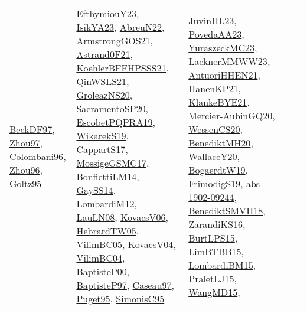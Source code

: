 {\begin{longtable}{llp{6cm}p{6cm}p{6cm}}
\href{papers/BeckDF97.pdf}{BeckDF97}\cite{BeckDF97}, \href{articles/Zhou97.pdf}{Zhou97}\cite{Zhou97}, \href{papers/Colombani96.pdf}{Colombani96}\cite{Colombani96}, \href{papers/Zhou96.pdf}{Zhou96}\cite{Zhou96}, \href{papers/Goltz95.pdf}{Goltz95}\cite{Goltz95} & \href{papers/EfthymiouY23.pdf}{EfthymiouY23}\cite{EfthymiouY23}, \href{articles/IsikYA23.pdf}{IsikYA23}\cite{IsikYA23}, \href{articles/AbreuN22.pdf}{AbreuN22}\cite{AbreuN22}, \href{papers/ArmstrongGOS21.pdf}{ArmstrongGOS21}\cite{ArmstrongGOS21}, \href{papers/Astrand0F21.pdf}{Astrand0F21}\cite{Astrand0F21}, \href{articles/KoehlerBFFHPSSS21.pdf}{KoehlerBFFHPSSS21}\cite{KoehlerBFFHPSSS21}, \href{articles/QinWSLS21.pdf}{QinWSLS21}\cite{QinWSLS21}, \href{papers/GroleazNS20.pdf}{GroleazNS20}\cite{GroleazNS20}, \href{articles/SacramentoSP20.pdf}{SacramentoSP20}\cite{SacramentoSP20}, \href{articles/EscobetPQPRA19.pdf}{EscobetPQPRA19}\cite{EscobetPQPRA19}, \href{articles/WikarekS19.pdf}{WikarekS19}\cite{WikarekS19}, \href{papers/CappartS17.pdf}{CappartS17}\cite{CappartS17}, \href{papers/MossigeGSMC17.pdf}{MossigeGSMC17}\cite{MossigeGSMC17}, \href{papers/BonfiettiLM14.pdf}{BonfiettiLM14}\cite{BonfiettiLM14}, \href{papers/GaySS14.pdf}{GaySS14}\cite{GaySS14}, \href{articles/LombardiM12.pdf}{LombardiM12}\cite{LombardiM12}, \href{papers/LauLN08.pdf}{LauLN08}\cite{LauLN08}, \href{papers/KovacsV06.pdf}{KovacsV06}\cite{KovacsV06}, \href{papers/HebrardTW05.pdf}{HebrardTW05}\cite{HebrardTW05}, \href{articles/VilimBC05.pdf}{VilimBC05}\cite{VilimBC05}, \href{papers/KovacsV04.pdf}{KovacsV04}\cite{KovacsV04}, \href{papers/VilimBC04.pdf}{VilimBC04}\cite{VilimBC04}, \href{articles/BaptisteP00.pdf}{BaptisteP00}\cite{BaptisteP00}, \href{papers/BaptisteP97.pdf}{BaptisteP97}\cite{BaptisteP97}, \href{papers/Caseau97.pdf}{Caseau97}\cite{Caseau97}, \href{papers/Puget95.pdf}{Puget95}\cite{Puget95}, \href{papers/SimonisC95.pdf}{SimonisC95}\cite{SimonisC95} & \href{papers/JuvinHL23.pdf}{JuvinHL23}\cite{JuvinHL23}, \href{papers/PovedaAA23.pdf}{PovedaAA23}\cite{PovedaAA23}, \href{papers/YuraszeckMC23.pdf}{YuraszeckMC23}\cite{YuraszeckMC23}, \href{articles/LacknerMMWW23.pdf}{LacknerMMWW23}\cite{LacknerMMWW23}, \href{papers/AntuoriHHEN21.pdf}{AntuoriHHEN21}\cite{AntuoriHHEN21}, \href{papers/HanenKP21.pdf}{HanenKP21}\cite{HanenKP21}, \href{papers/KlankeBYE21.pdf}{KlankeBYE21}\cite{KlankeBYE21}, \href{papers/Mercier-AubinGQ20.pdf}{Mercier-AubinGQ20}\cite{Mercier-AubinGQ20}, \href{papers/WessenCS20.pdf}{WessenCS20}\cite{WessenCS20}, \href{articles/BenediktMH20.pdf}{BenediktMH20}\cite{BenediktMH20}, \href{articles/WallaceY20.pdf}{WallaceY20}\cite{WallaceY20}, \href{papers/BogaerdtW19.pdf}{BogaerdtW19}\cite{BogaerdtW19}, \href{papers/FrimodigS19.pdf}{FrimodigS19}\cite{FrimodigS19}, \href{articles/abs-1902-09244.pdf}{abs-1902-09244}\cite{abs-1902-09244}, \href{papers/BenediktSMVH18.pdf}{BenediktSMVH18}\cite{BenediktSMVH18}, \href{articles/ZarandiKS16.pdf}{ZarandiKS16}\cite{ZarandiKS16}, \href{papers/BurtLPS15.pdf}{BurtLPS15}\cite{BurtLPS15}, \href{papers/LimBTBB15.pdf}{LimBTBB15}\cite{LimBTBB15}, \href{papers/LombardiBM15.pdf}{LombardiBM15}\cite{LombardiBM15}, \href{papers/PraletLJ15.pdf}{PraletLJ15}\cite{PraletLJ15}, \href{articles/WangMD15.pdf}{WangMD15}\cite{WangMD15}, 
\end{longtable}}

